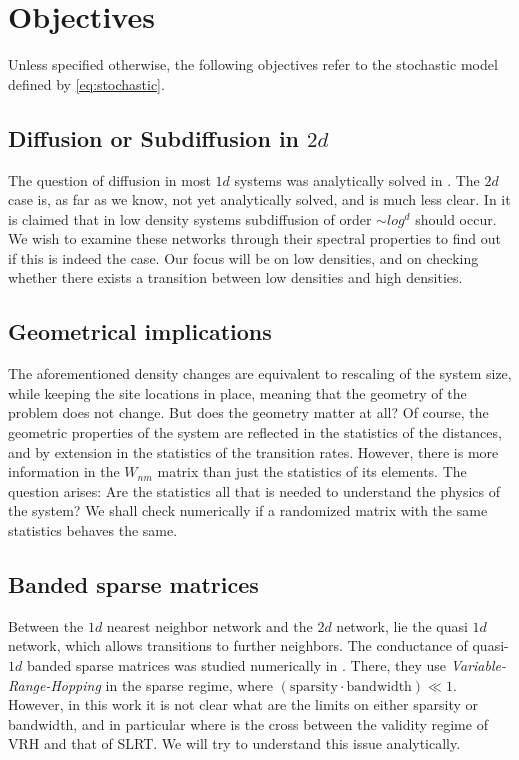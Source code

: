\chapter{Objectives}


Unless specified otherwise, the following objectives refer
to the stochastic model defined by \autoref{eq:stochastic}. 

\section{Diffusion or Subdiffusion in $2d$}

The question of diffusion in most $1d$ systems was analytically solved in \cite{alexander_excitation_1981}. 
The $2d$ case is, as far as we know, not yet analytically solved, and is much less clear. 
In \cite{amir_localization_2010} it is claimed that in low density systems subdiffusion of
order $\sim log^d$ should occur. We wish to examine these networks through their spectral
properties to find out if this is indeed the case. Our focus will be on low densities,
and on checking whether there exists a transition between low densities and high densities.


\section{Geometrical implications}

The aforementioned density changes are equivalent to rescaling of the system size,
while keeping the site locations in place, meaning that the geometry of the problem 
does not change. But does the geometry matter at all? Of course, the geometric properties
of the system are reflected in the statistics of the distances,
and by extension in the statistics of the transition rates. 
However, there is more information in the $W_{nm}$ matrix than just the statistics of its elements.
The question arises: Are the statistics all that is needed to understand the physics of the system? 
We shall check numerically if a randomized matrix with the same statistics behaves the same.



\section{Banded sparse matrices}

Between the $1d$ nearest neighbor network and the $2d$ network,
lie the quasi $1d$ network, which allows transitions to further neighbors.
The conductance of quasi-$1d$ banded sparse matrices was studied numerically in \cite{stotland_random-matrix_2010}. There, they use \emph{Variable-Range-Hopping} in the sparse regime, where 
$(\text{sparsity}\cdot \text{bandwidth}) \ll 1$. 
However, in this work it is not clear what are the limits on either sparsity or bandwidth, and in particular where is the cross between the validity regime of VRH and that of SLRT. We will try to understand this issue analytically.


